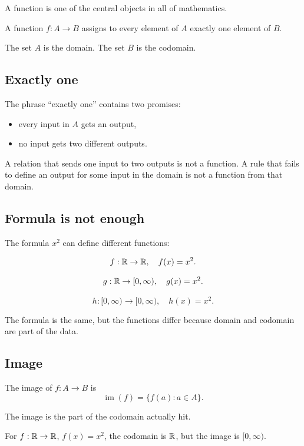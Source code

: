 \documentclass[12pt]{article}
\begin{document}
A function is one of the central objects in all of mathematics.

\begin{definition}
A function $f:A\to B$ assigns to every element of $A$ exactly one element of $B$.
\end{definition}

The set $A$ is the domain. The set $B$ is the codomain.

\subsection{Exactly one}

The phrase ``exactly one'' contains two promises:

\begin{itemize}
\item every input in $A$ gets an output,
\item no input gets two different outputs.
\end{itemize}

A relation that sends one input to two outputs is not a function. A rule that fails to define an output for some input in the domain is not a function from that domain.

\subsection{Formula is not enough}

The formula $x^2$ can define different functions:

\[
f:\mathbb{R}\to\mathbb{R},\quad f(x)=x^2.
\]

\[
g:\mathbb{R}\to[0,\infty),\quad g(x)=x^2.
\]

\[
h:[0,\infty)\to[0,\infty),\quad h(x)=x^2.
\]

The formula is the same, but the functions differ because domain and codomain are part of the data.

\subsection{Image}

\begin{definition}
The image of $f:A\to B$ is
\[
\operatorname{im}(f)=\{f(a):a\in A\}.
\]
\end{definition}

The image is the part of the codomain actually hit.

For $f:\mathbb{R}\to\mathbb{R}$, $f(x)=x^2$, the codomain is $\mathbb{R}$, but the image is $[0,\infty)$.
\end{document}
